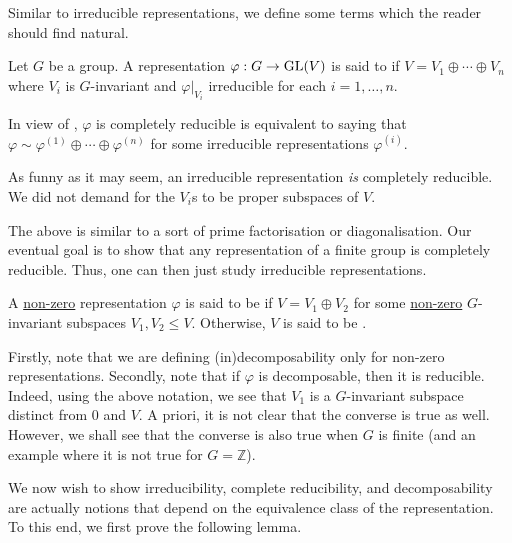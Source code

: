 Similar to irreducible representations, we define some terms which the reader should find natural.

\begin{defn}%
	Let $G$ be a group. A representation $\varphi:G\to \operatorname{GL}(V)$ is said to  if $V = V_1 \oplus \cdots \oplus V_n$ where $V_i$ is $G$-invariant and $\varphi|_{V_i}$ irreducible for each $i = 1, \ldots, n.$
\end{defn}

\begin{rem}
	In view of , $\varphi$ is completely reducible is equivalent to saying that $\varphi\sim\varphi^{(1)}\oplus\cdots\oplus\varphi^{(n)}$ for some irreducible representations $\varphi^{(i)}.$
\end{rem}

\begin{rem}
	As funny as it may seem, an irreducible representation \emph{is} completely reducible. We did not demand for the $V_i$s to be proper subspaces of $V.$
\end{rem}

The above is similar to a sort of prime factorisation or diagonalisation. Our eventual goal is to show that any representation of a finite group is completely reducible. Thus, one can then just study irreducible representations.

\begin{defn}%
	A \underline{non-zero} representation $\varphi$ is said to be  if $V = V_1 \oplus V_2$ for some \underline{non-zero} $G$-invariant subspaces $V_1, V_2 \le V.$ Otherwise, $V$ is said to be .
\end{defn}

Firstly, note that we are defining (in)decomposability only for non-zero representations. Secondly, note that if $\varphi$ is decomposable, then it is reducible. Indeed, using the above notation, we see that $V_1$ is a $G$-invariant subspace distinct from $0$ and $V$. A priori, it is not clear that the converse is true as well. However, we shall see that the converse is also true when $G$ is finite (and an example where it is not true for $G = \mathbb{Z}$).

We now wish to show irreducibility, complete reducibility, and decomposability are actually notions that depend on the equivalence class of the representation. To this end, we first prove the following lemma.

